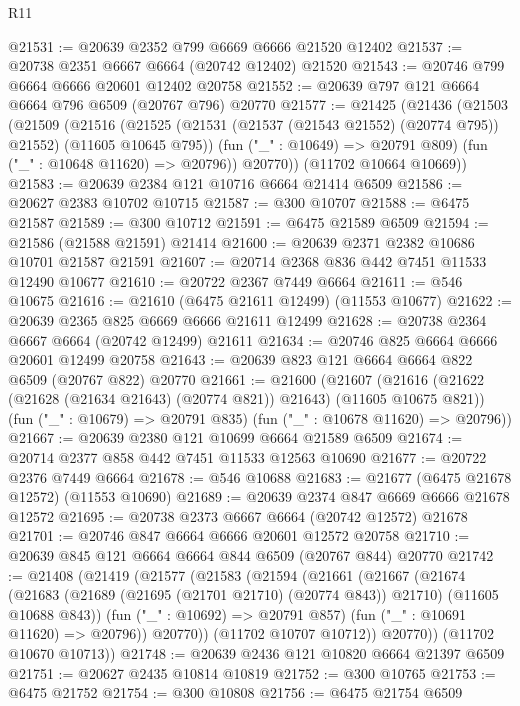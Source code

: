 \begin{lexlean}{R11}
\begin{coremodule}
@21531 := @20639 @2352 @799 @6669 @6666 @21520 @12402
@21537 := @20738 @2351 @6667 @6664 (@20742 @12402) @21520
@21543 := @20746 @799 @6664 @6666 @20601 @12402 @20758
@21552 := @20639 @797 @121 @6664 @6664 @796 @6509 (@20767 @796) @20770
@21577 := @21425
    (@21436
      (@21503
        (@21509
          (@21516
            (@21525 (@21531 (@21537 (@21543 @21552) (@20774 @795)) @21552) (@11605 @10645 @795))
            (fun ("_" : @10649) => @20791 @809)
            (fun ("_" : @10648 @11620) => @20796))
          @20770))
      (@11702 @10664 @10669))
@21583 := @20639 @2384 @121 @10716 @6664 @21414 @6509
@21586 := @20627 @2383 @10702 @10715
@21587 := @300 @10707
@21588 := @6475 @21587
@21589 := @300 @10712
@21591 := @6475 @21589 @6509
@21594 := @21586 (@21588 @21591) @21414
@21600 := @20639 @2371 @2382 @10686 @10701 @21587 @21591
@21607 := @20714 @2368 @836 @442 @7451 @11533 @12490 @10677
@21610 := @20722 @2367 @7449 @6664
@21611 := @546 @10675
@21616 := @21610 (@6475 @21611 @12499) (@11553 @10677)
@21622 := @20639 @2365 @825 @6669 @6666 @21611 @12499
@21628 := @20738 @2364 @6667 @6664 (@20742 @12499) @21611
@21634 := @20746 @825 @6664 @6666 @20601 @12499 @20758
@21643 := @20639 @823 @121 @6664 @6664 @822 @6509 (@20767 @822) @20770
@21661 := @21600
    (@21607
      (@21616 (@21622 (@21628 (@21634 @21643) (@20774 @821)) @21643) (@11605 @10675 @821))
      (fun ("_" : @10679) => @20791 @835)
      (fun ("_" : @10678 @11620) => @20796))
@21667 := @20639 @2380 @121 @10699 @6664 @21589 @6509
@21674 := @20714 @2377 @858 @442 @7451 @11533 @12563 @10690
@21677 := @20722 @2376 @7449 @6664
@21678 := @546 @10688
@21683 := @21677 (@6475 @21678 @12572) (@11553 @10690)
@21689 := @20639 @2374 @847 @6669 @6666 @21678 @12572
@21695 := @20738 @2373 @6667 @6664 (@20742 @12572) @21678
@21701 := @20746 @847 @6664 @6666 @20601 @12572 @20758
@21710 := @20639 @845 @121 @6664 @6664 @844 @6509 (@20767 @844) @20770
@21742 := @21408
    (@21419
      (@21577
        (@21583
          (@21594
            (@21661
              (@21667
                (@21674
                  (@21683
                    (@21689 (@21695 (@21701 @21710) (@20774 @843)) @21710)
                    (@11605 @10688 @843))
                  (fun ("_" : @10692) => @20791 @857)
                  (fun ("_" : @10691 @11620) => @20796))
                @20770))
            (@11702 @10707 @10712))
          @20770))
      (@11702 @10670 @10713))
@21748 := @20639 @2436 @121 @10820 @6664 @21397 @6509
@21751 := @20627 @2435 @10814 @10819
@21752 := @300 @10765
@21753 := @6475 @21752
@21754 := @300 @10808
@21756 := @6475 @21754 @6509

\end{coremodule}
\end{lexlean}
